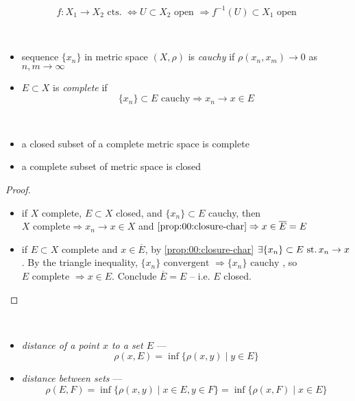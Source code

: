 \begin{prop}\label{prop:0.23}
  \[
  f: X_1\rightarrow X_2\text{ cts. }\iff
  U\subset X_2\text{ open }\Rightarrow f^{-1}(U)\subset X_1\text{ open }
  \]
\end{prop}

\begin{defn}\
  \begin{itemize}
  \item sequence ${\{x_n\}}$ in metric space ${(X,\rho)}$
    is \emph{cauchy} if
    $\rho(x_n, x_m) \rightarrow 0$ as $n, m\rightarrow \infty$
  \item ${E\subset X}$ is \emph{complete} if
    \[
    \{x_n\}\subset E\text{ cauchy}\Rightarrow x_n\rightarrow x\in E
    \]
  \end{itemize}
\end{defn}

\begin{prop}\label{prop:0.24}\
  \begin{itemize}
  \item a closed subset of a complete metric space is complete
  \item a complete subset of metric space is closed
  \end{itemize}
\end{prop}
\begin{proof}\
  \begin{itemize}
  \item if $X$ complete, ${E\subset X}$ closed, and
    ${\{x_n\}\subset E}$ cauchy, then
    ${X\text{ complete}\Rightarrow x_n\rightarrow x\in X}$
    and
    ${\ref{prop:00:closure-char} \Rightarrow x\in \overline E = E}$
  \item if ${E\subset X}$ complete and ${x\in\overline E}$, by
    \ref{prop:00:closure-char}
    ${\exists \{x_n\}\subset E\operatorname{\,st.} x_n\rightarrow x}$.
    By the triangle inequality,
    ${\{x_n\}\text{ convergent }\Rightarrow\{x_n\}\text{ cauchy }}$,
    so
    ${E\text{ complete }\Rightarrow x\in E}$.
    Conclude ${\overline E = E}$ -- i.e. $E$ closed.
  \end{itemize}
\end{proof}

\begin{defn}\
  \begin{itemize}
  \item \emph{distance of a point $x$ to a set $E$} ---
    \[ \rho(x, E) = \inf\{\rho(x,y)\mid y\in E\} \]
  \item \emph{distance between sets} ---
    \[
    \rho(E,F)=\inf\{\rho(x,y)\mid x\in E, y\in F\}=
    \inf\{\rho(x,F)\mid x\in E\}
    \]
  \end{itemize}
\end{defn}

